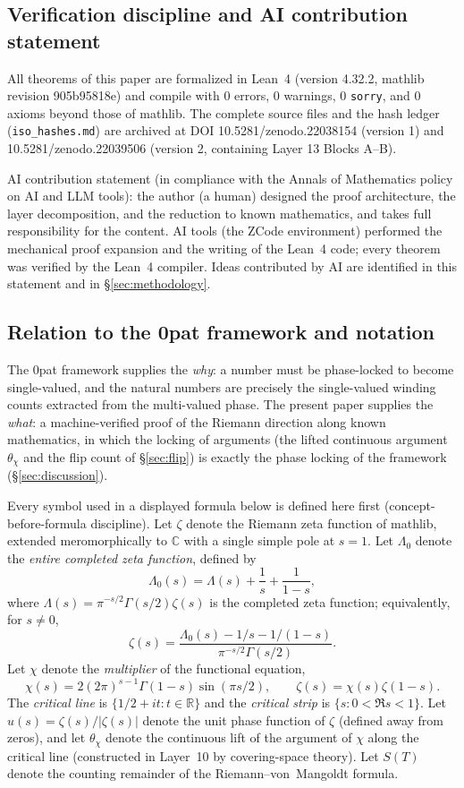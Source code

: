 \documentclass{article}
\newcommand{\C}{\mathbb{C}}
\newcommand{\R}{\mathbb{R}}
\newcommand{\GG}{\Gamma}
\newcommand{\zt}{\zeta}
\newcommand{\Lam}{\Lambda}
\newcommand{\Xchi}{\chi}
\begin{document}
\subsection{Verification discipline and AI contribution statement}
\label{sec:calibration}

All theorems of this paper are formalized in Lean~4 (version 4.32.2, mathlib
revision 905b95818e) and compile with $0$ errors, $0$ warnings, $0$
\texttt{sorry}, and $0$ axioms beyond those of mathlib. The complete source
files and the hash ledger (\texttt{iso\_hashes.md}) are archived at DOI
10.5281/zenodo.22038154 (version 1) and 10.5281/zenodo.22039506 (version 2,
containing Layer 13 Blocks A--B).

AI contribution statement (in compliance with the Annals of Mathematics
policy on AI and LLM tools): the author (a human) designed the proof
architecture, the layer decomposition, and the reduction to known
mathematics, and takes full responsibility for the content. AI tools (the
ZCode environment) performed the mechanical proof expansion and the writing
of the Lean~4 code; every theorem was verified by the Lean~4 compiler. Ideas
contributed by AI are identified in this statement and in
\S\ref{sec:methodology}.

\subsection{Relation to the 0pat framework and notation}
\label{sec:relation}

The 0pat framework supplies the \emph{why}: a number must be phase-locked to
become single-valued, and the natural numbers are precisely the single-valued
winding counts extracted from the multi-valued phase. The present paper
supplies the \emph{what}: a machine-verified proof of the Riemann direction
along known mathematics, in which the locking of arguments (the lifted
continuous argument $\theta_\Xchi$ and the flip count of
\S\ref{sec:flip}) is exactly the phase locking of the framework
(\S\ref{sec:discussion}).

Every symbol used in a displayed formula below is defined here first
(concept-before-formula discipline). Let $\zt$ denote the Riemann zeta
function of mathlib, extended meromorphically to $\C$ with a single simple
pole at $s=1$. Let $\Lam_0$ denote the \emph{entire completed zeta
function}, defined by
\[
\Lam_0(s)=\Lam(s)+\frac{1}{s}+\frac{1}{1-s},
\]
where $\Lam(s)=\pi^{-s/2}\GG(s/2)\zt(s)$ is the completed zeta function;
equivalently, for $s\neq 0$,
\[
\zt(s)=\frac{\Lam_0(s)-1/s-1/(1-s)}{\pi^{-s/2}\GG(s/2)}.
\]
Let $\Xchi$ denote the \emph{multiplier} of the functional equation,
\[
\Xchi(s)=2(2\pi)^{s-1}\GG(1-s)\sin(\pi s/2),
\qquad
\zt(s)=\Xchi(s)\zt(1-s).
\]
The \emph{critical line} is $\{1/2+it:t\in\R\}$ and the \emph{critical
strip} is $\{s:0<\Re s<1\}$. Let $u(s)=\zt(s)/|\zt(s)|$ denote the unit
phase function of $\zt$ (defined away from zeros), and let $\theta_\Xchi$
denote the continuous lift of the argument of $\Xchi$ along the critical
line (constructed in Layer~10 by covering-space theory). Let
$S(T)$ denote the counting remainder of the Riemann--von~Mangoldt formula.
\end{document}
